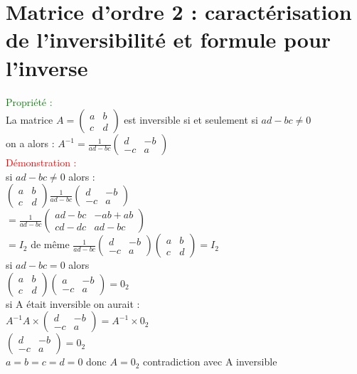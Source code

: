 \documentclass{article}
\begin{document}
	\section{ Matrice d'ordre 2 : caractérisation de l'inversibilité et formule pour l'inverse}
	\textcolor{green}{Propriété :} \\
	La matrice $A=\begin{pmatrix}
a & b \\
c & d
\end{pmatrix}$ est inversible si et seulement si $ad-bc \neq 0$ \\
 on a alors : $A^{-1}=\frac{1}{ad-bc}\begin{pmatrix}
d & -b \\
-c & a
\end{pmatrix}$ \\
\textcolor{red}{Démonstration :} \\
si $ad-bc \neq 0$ alors : \\
$\begin{pmatrix}
a & b \\
c & d
\end{pmatrix} \frac{1}{ad-bc}\begin{pmatrix}
d & -b \\
-c & a
\end{pmatrix}$  \\
$=\frac{1}{ad-bc}
\begin{pmatrix}
ad-bc & -ab+ab \\
cd-dc & ad-bc
\end{pmatrix}$ \\
$=I_2$ de même $\frac{1}{ad-bc}\begin{pmatrix} d & -b \\ -c & a \end{pmatrix}
\begin{pmatrix} a &b \\ c & d  \end{pmatrix} =I_2 $ \\
	si $ad-bc=0$ alors \\
	$\begin{pmatrix} a & b \\ c & d \end{pmatrix} \begin{pmatrix} a & -b \\ -c & a \end{pmatrix}=0_2$ \\
	si A était inversible on aurait : \\
	$A^{-1} A \times \begin{pmatrix} d & -b \\ -c & a \end{pmatrix} =A^{-1} \times 0_2 $ \\
	$\begin{pmatrix} d & -b \\ -c & a \end{pmatrix}=0_2$ \\
	$a=b=c=d=0$ donc $A=0_2$ contradiction avec A inversible
\end{document}
